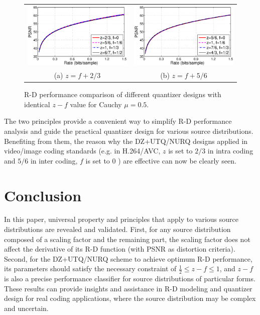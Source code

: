 \documentclass[smallabstract,smallcaptions]{dccpaper}
\begin{document}
\begin{figure}
\begin{center}
\begin{tabular}{cc}
\includegraphics[width = 0.45\linewidth]{Figures/section4/RD_Cauchy_mu=0_5_z=p+0_67} &
\includegraphics[width = 0.45\linewidth]{Figures/section4/RD_Cauchy_mu=0_5_z=p+0_83} \\
{\small (a) $z=f+2/3$} & {\small (b) $z=f+5/6$}
\end{tabular}
\end{center}
\vspace{-20pt}
\caption{\label{fig:RD_same_pattern}
R-D performance comparison of different quantizer designs with identical $z-f$ value for Cauchy $\mu=0.5$.}
\end{figure}

The two principles provide a convenient way to simplify R-D performance analysis and guide the practical quantizer design for various source distributions. Benefiting from them, the reason why the DZ+UTQ/NURQ designs applied in video/image coding standards (e.g. in H.264/AVC, $z$ is set to $2/3$ in intra coding and $5/6$ in inter coding, $f$ is set to $0$ \cite{Sullivan_VCIP2005}) are effective can now be clearly seen.

\section{Conclusion}
\label{sec:conclusion}

In this paper, universal property and principles that apply to various source distributions are revealed and validated. First, for any source distribution composed of a scaling factor and the remaining part, the scaling factor does not affect the derivative of its R-D function (with PSNR as distortion criteria). Second, for the DZ+UTQ/NURQ scheme to achieve optimum R-D performance, its parameters should satisfy the necessary constraint of $\frac{1}{2} \le z - f \le 1$, and $z - f$ is also a precise performance classifier for source distributions of particular forms. These results can provide insights and assistance in R-D modeling and quantizer design for real coding applications, where the source distribution may be complex and uncertain.
\end{document}
